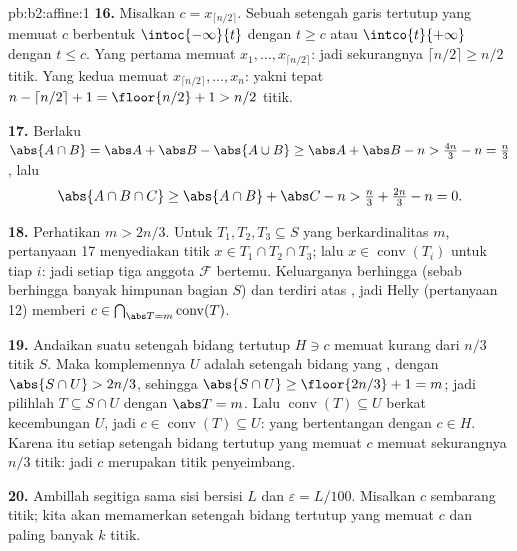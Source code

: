 \begin{solution}{pb:b2:affine:1}
\textbf{16.} Misalkan $c = x_{\lceil n/2\rceil}$. Sebuah setengah
garis tertutup yang memuat $c$ berbentuk $\intoc{-\infty}{t}$ dengan $t \geq
c$ atau $\intco{t}{+\infty}$ dengan $t \leq c$. Yang pertama
memuat $x_1, \dots, x_{\lceil n/2\rceil}$: jadi sekurangnya
$\lceil n/2\rceil \geq n/2$ titik. Yang kedua memuat
$x_{\lceil n/2\rceil}, \dots, x_n$: yakni tepat $n - \lceil
n/2\rceil + 1 = \floor{n/2} + 1 > n/2$ titik.

\textbf{17.} Berlaku $\abs{A \cap B} = \abs A + \abs B - \abs{A \cup
B} \geq \abs A + \abs B - n > \tfrac{4n}3 - n = \tfrac n3$,
lalu
\[
\abs{A \cap B \cap C} \geq \abs{A \cap B} + \abs C - n >
\tfrac n3 + \tfrac{2n}3 - n = 0 .
\]

\textbf{18.} Perhatikan $m > 2n/3$. Untuk $T_1, T_2, T_3 \subseteq S$
yang berkardinalitas $m$, pertanyaan 17 menyediakan titik $x \in T_1
\cap T_2 \cap T_3$; lalu $x \in \operatorname{conv}(T_i)$ untuk
tiap $i$: jadi setiap tiga anggota $\mathcal F$ bertemu. Keluarganya
berhingga (sebab berhingga banyak himpunan bagian $S$) dan terdiri atas
, jadi Helly (pertanyaan 12) memberi $c \in
\bigcap_{\abs T = m}\operatorname{conv}(T)$.

\textbf{19.} Andaikan suatu setengah bidang tertutup $H \ni c$
memuat kurang dari $n/3$ titik $S$. Maka komplemennya $U$
adalah setengah bidang  yang , dengan $\abs{S \cap U} > 2n/3$,
sehingga $\abs{S \cap U} \geq \floor{2n/3} + 1 = m$; jadi pilihlah $T
\subseteq S \cap U$ dengan $\abs T = m$. Lalu
$\operatorname{conv}(T) \subseteq U$ berkat kecembungan $U$, jadi
$c \in \operatorname{conv}(T) \subseteq U$: yang bertentangan
dengan $c \in H$. Karena itu setiap setengah bidang tertutup yang memuat $c$
memuat sekurangnya $n/3$ titik: jadi $c$ merupakan titik penyeimbang.

\textbf{20.} Ambillah segitiga sama sisi bersisi $L$ dan
$\varepsilon = L/100$. Misalkan $c$ sembarang titik; kita akan memamerkan
setengah bidang tertutup yang memuat $c$ dan paling banyak $k$ titik.


\end{solution}
